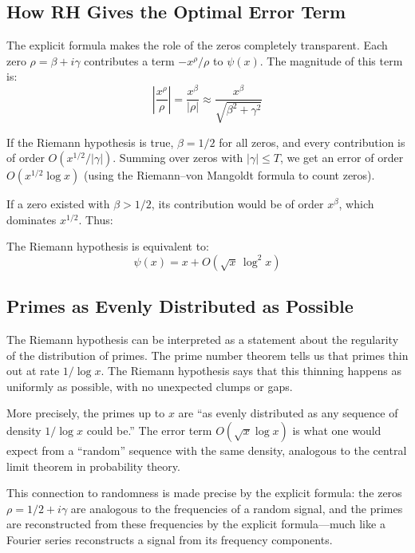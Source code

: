 \subsection{How RH Gives the Optimal Error Term}

The explicit formula makes the role of the zeros completely transparent. Each zero $\rho = \beta + i\gamma$ contributes a term $-x^{\rho}/\rho$ to $\psi(x)$. The magnitude of this term is:
\[
\left|\frac{x^{\rho}}{\rho}\right| = \frac{x^{\beta}}{|\rho|} \approx \frac{x^{\beta}}{\sqrt{\beta^2 + \gamma^2}}
\]

If the Riemann hypothesis is true, $\beta = 1/2$ for all zeros, and every contribution is of order $O(x^{1/2} / |\gamma|)$. Summing over zeros with $|\gamma| \le T$, we get an error of order $O(x^{1/2} \log x)$ (using the Riemann--von Mangoldt formula to count zeros).

If a zero existed with $\beta > 1/2$, its contribution would be of order $x^{\beta}$, which dominates $x^{1/2}$. Thus:

\begin{proposition}
\label{prop:rh_error}
The Riemann hypothesis is equivalent to:
\[
\psi(x) = x + O(\sqrt{x} \, \log^2 x)
\]
\end{proposition}

\subsection{Primes as Evenly Distributed as Possible}

The Riemann hypothesis can be interpreted as a statement about the regularity of the distribution of primes. The prime number theorem tells us that primes thin out at rate $1/\log x$. The Riemann hypothesis says that this thinning happens as uniformly as possible, with no unexpected clumps or gaps.

More precisely, the primes up to $x$ are ``as evenly distributed as any sequence of density $1/\log x$ could be.'' The error term $O(\sqrt{x} \log x)$ is what one would expect from a ``random'' sequence with the same density, analogous to the central limit theorem in probability theory.

This connection to randomness is made precise by the explicit formula: the zeros $\rho = 1/2 + i\gamma$ are analogous to the frequencies of a random signal, and the primes are reconstructed from these frequencies by the explicit formula---much like a Fourier series reconstructs a signal from its frequency components.

